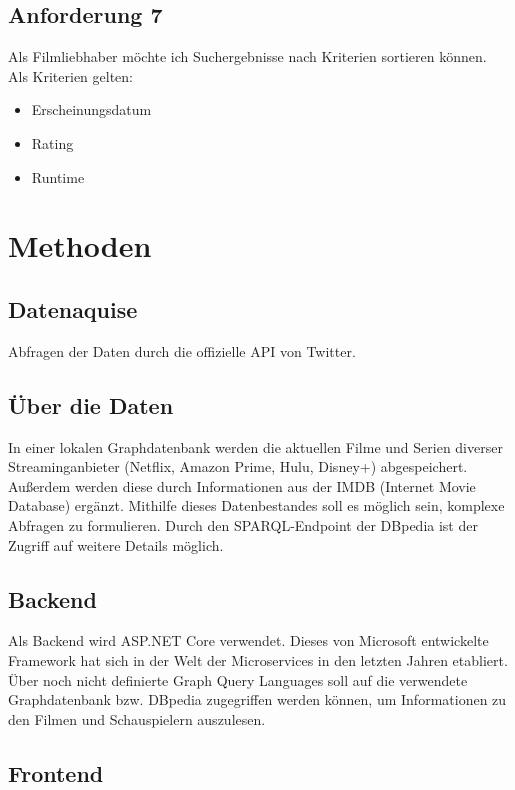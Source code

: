 \documentclass[conference]{IEEEtran}
\begin{document}
\subsection{Anforderung 7}

Als Filmliebhaber möchte ich Suchergebnisse nach Kriterien sortieren können.
\\
Als Kriterien gelten:

\begin{itemize}
        \item Erscheinungsdatum
        \item Rating
        \item Runtime
\end{itemize}

\section{Methoden}

\subsection*{Datenaquise}

Abfragen der Daten durch die offizielle API von Twitter.

\subsection*{Über die Daten}

In einer lokalen Graphdatenbank werden die aktuellen Filme und Serien diverser Streaminganbieter (Netflix, Amazon Prime, Hulu, Disney+) abgespeichert. Außerdem werden diese durch Informationen aus der IMDB (Internet Movie Database) ergänzt. Mithilfe dieses Datenbestandes soll es möglich sein, komplexe Abfragen zu formulieren. Durch den SPARQL-Endpoint der DBpedia ist der Zugriff auf weitere Details möglich.

\subsection*{Backend}

Als Backend wird ASP.NET Core verwendet. Dieses von Microsoft entwickelte Framework hat sich in der Welt der Microservices in den letzten Jahren etabliert. Über noch nicht definierte Graph Query Languages soll auf die verwendete Graphdatenbank bzw. DBpedia zugegriffen werden können, um Informationen zu den Filmen und Schauspielern auszulesen.

\subsection*{Frontend}
\end{document}
